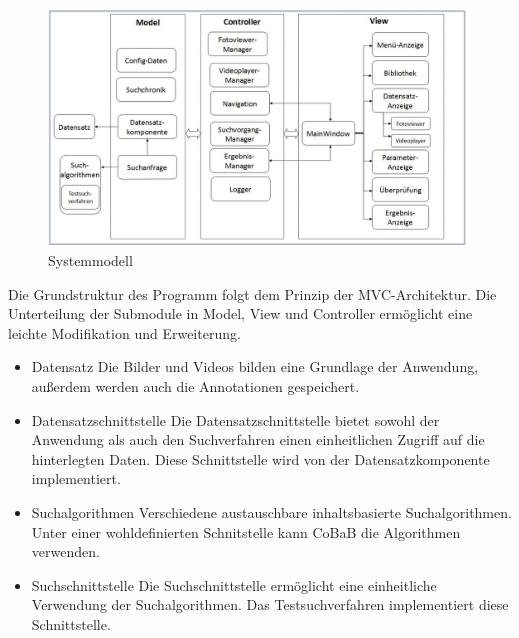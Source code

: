 \begin{figure}[h]
\includegraphics[width=1\linewidth]{img/sysmodell}
\caption{Systemmodell}
\label{fig:systemmodell}
\end{figure}
\vspace{10pt}

Die Grundstruktur des Programm folgt dem Prinzip der MVC-Architektur. Die Unterteilung der Submodule in Model, View und Controller ermöglicht eine leichte Modifikation und Erweiterung.

\begin{itemize}
\item Datensatz\newline
Die Bilder und Videos bilden eine Grundlage der Anwendung, außerdem werden auch die Annotationen gespeichert.
\item Datensatzschnittstelle\newline
Die Datensatzschnittstelle bietet sowohl der Anwendung als auch den Suchverfahren einen einheitlichen Zugriff auf die hinterlegten Daten. Diese Schnittstelle wird von der Datensatzkomponente implementiert.
\item Suchalgorithmen\newline
Verschiedene austauschbare inhaltsbasierte Suchalgorithmen. Unter einer wohldefinierten Schnitstelle kann CoBaB die Algorithmen verwenden.
\item Suchschnittstelle\newline
Die Suchschnittstelle ermöglicht eine einheitliche Verwendung der Suchalgorithmen. Das Testsuchverfahren implementiert diese Schnittstelle.
\end{itemize}

